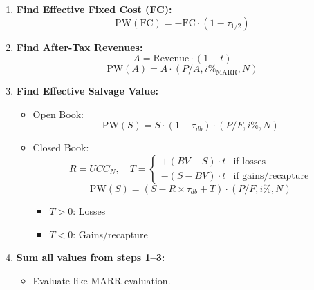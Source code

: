 \begin{process}
    \begin{enumerate}
        \item \textbf{Find Effective Fixed Cost (FC):}
        \begin{equation}
            \text{PW}(\text{FC}) = - \text{FC} \cdot (1 - \tau_{1/2})
        \end{equation}
    
        \item \textbf{Find After-Tax Revenues:}
        \begin{equation}
            A = \text{Revenue} \cdot (1 - t)
        \end{equation}
        \begin{equation}
            \text{PW}(A) = A \cdot (P/A, i\%_{\text{MARR}}, N)
        \end{equation}
    
        \item \textbf{Find Effective Salvage Value:}
        \begin{itemize}
            \item Open Book:
            \begin{equation}
                \text{PW}(S) = S \cdot (1 - \tau_{db}) \cdot (P/F, i\%, N)
            \end{equation}
            \item Closed Book:
            \begin{equation}
                R = UCC_N, \quad T = \begin{cases} 
                +(BV-S) \cdot t & \text{if losses} \\
                -(S-BV) \cdot t & \text{if gains/recapture}
                \end{cases}
            \end{equation}
            \begin{equation}
                \text{PW}(S) = (S - R \times \tau_{db} + T) \cdot (P/F, i\%, N)
            \end{equation}
            \begin{itemize}
                \item \(T>0\): Losses
                \item \(T<0\): Gains/recapture 
            \end{itemize}
        \end{itemize}
    
        \item \textbf{Sum all values from steps 1--3:}
        \begin{itemize}
            \item Evaluate like MARR evaluation.
        \end{itemize}
    \end{enumerate}
\end{process}